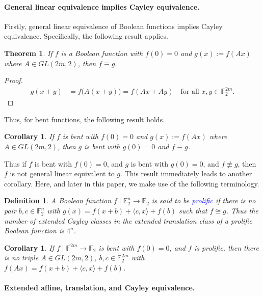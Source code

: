 \documentclass[12pt,a4paper]{article}
\newcommand{\mb}[1]{\mathbb{#1}}
\newcommand{\F}{\mb{F}}
\newcommand{\To}{\rightarrow}
\newcommand{\Emph}[1]{\emph{\textcolor{blue}{#1}}}
\newtheorem{Theorem}{Theorem}
\newtheorem{Corollary}[Lemma]{Corollary}
\newtheorem{Definition}{Definition}
\begin{document}
\paragraph*{General linear equivalence implies Cayley equivalence.}

Firstly, general linear equivalence of Boolean functions implies Cayley equivalence.
Specifically, the following result applies.
\begin{Theorem}
\label{th-Linear-Cayley}
If $f$ is a Boolean function with $f(0)=0$ and $g(x) := f(A x)$ where $A \in GL(2m,2)$,
then $f \equiv g$.
\end{Theorem}
\begin{proof}
\begin{align*}
g(x+y) &= f\big(A(x+y)\big) = f(A x + A y)\quad \text{for all~} x,y \in \F_2^{2m}.
\end{align*}
\end{proof}
Thus, for bent functions, the following result holds.
\begin{Corollary}
\label{corr-bent-Linear-Cayley}
If $f$ is bent with $f(0)=0$ and $g(x) := f(A x)$ where $A \in GL(2m,2)$,
then $g$ is bent with $g(0)=0$ and $f \equiv g$.
\end{Corollary}
Thus if $f$ is bent with $f(0)=0$, and $g$ is bent with $g(0)=0$, and $f \not\equiv g$,
then $f$ is not general linear equivalent to $g$.
This result immediately leads to another corollary.
Here, and later in this paper, we make use of the following terminology.
\begin{Definition}
A Boolean function $f \mid \F_2^{n} \To \F_2$ is said to be \Emph{prolific} if
there is no pair $b, c \in \F_2^{n}$ with $g(x) = f(x+b) + \langle c, x \rangle + f(b)$ such that $f \cong g$.
Thus the number of extended Cayley classes in the extended translation class of a prolific Boolean function
is $4^n$.
\end{Definition}

\begin{Corollary}
 \label{corr-no-Cayley-no-Linear}
If $f \mid \F^{2m} \To \F_2$ is bent with $f(0)=0$, and $f$ is prolific, then there is no triple
$A \in GL(2m,2)$, $b, c \in \F_2^{2m}$ with $f(Ax) = f(x+b) + \langle c, x \rangle + f(b)$.
\end{Corollary}


\paragraph*{Extended affine, translation, and Cayley equivalence.}
\end{document}
